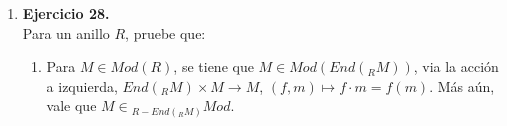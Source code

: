 \documentclass{article}
\newcommand{\lrprth}[1]{
	\left(#1\right)
}
\newcommand{\ringbimod}[4]{
	\if#4l
	{}_{#1-#2}#3
	\else
	\if#4r
	#3_{#1-#2}
	\else 
	\ifstrequal{#4}{lr}{
		{}_{#1}#3_{#2}
	}
	\fi
	\fi
}
\newcommand{\ringmodhom}[3]{
	Hom_{#1}\lrprth{#2,#3}
}
\theoremstyle{definition}
\theoremstyle{plain}
\theoremstyle{plain}
\theoremstyle{definition}
\theoremstyle{definition}
\theoremstyle{definition}
\theoremstyle{definition}
\theoremstyle{definition}
\theoremstyle{definition}
\begin{document}
\begin{enumerate}[label=\textbf{Ej \arabic*.}]
\begin{proof}
	\begin{align*}
		\rho\lrprth{ere\cdot\lrprth{em+em'}\cdot s}\lrprth{xe}&=\rho\lrprth{{ere}\cdot{e{\lrprth{m+m'}}\cdot s}}(xe)\\
		&=\rho\lrprth{ere\lrprth{m+m'}s}(xe)\\
		&=\lrprth{xe}\lrprth{re\lrprth{m+m'}s}\\
		&=\lrprth{xe}\lrprth{rems+rem's}\\
		&=\lrprth{xe}{rems}+\lrprth{xe}{rem's}\\
		&=\lrprth{\lrprth{xere}m}s+\lrprth{\lrprth{xere}m'}s\\
		&=\lrprth{\rho\lrprth{em}\lrprth{xere}}s+\lrprth{\rho\lrprth{em'}\lrprth{xere}}s\\
		&=\lrprth{\rho\lrprth{em}\lrprth{xe*ere}}s+\lrprth{\rho\lrprth{em'}\lrprth{xe*ere}}s\\
		&=\lrprth{ere\bullet\rho\lrprth{em}\lrprth{xe}}s+\lrprth{ere\bullet\rho\lrprth{em'}\lrprth{xe}}s\\
		&=\lrprth{ere\bullet\rho\lrprth{em}\bullet s}\lrprth{xe}+\lrprth{ere\bullet\rho\lrprth{em'}\bullet s}\lrprth{xe}\\
		&=\lrprth{ere\bullet\rho\lrprth{em}\bullet s+ere\bullet\rho\lrprth{em'}\bullet s}\lrprth{xe}\\
		\implies \rho\lrprth{{ere}\cdot\lrprth{em+em'}\cdot s}&=ere\bullet\rho\lrprth{em}\bullet s+ere\bullet\rho\lrprth{em'}\bullet s\\
		\therefore\  \rho&\in\ringmodhom{}{\ringbimod{R'}{S}{eM}{lr}}{\ringmodhom{R}{\ringbimod{R}{R'}{Re}{lr}}{\ringbimod{R}{S}{M}{lr}}}.
	\end{align*}
i.e. $\rho$ es un morfismo de $R$-izquierda $S'$-derecha bimódulos, de $eM$ en $\ringmodhom{R}{\ringbimod{R}{R'}{Re}{lr}}{\ringbimod{R}{S}{M}{lr}}$. En forma análoga, empleando ahora las acciones previamente definidas en conjunto a las acciones definidas en el Ej. 24(b), se verifica que $\lambda$ un morfismo de $R'$-izquierda $S$-derecha bimódulos, de $M\epsilon$ en $\ringmodhom{S}{\ringbimod{S'}{S }{Re}{lr}}{\ringbimod{R}{S}{M}{lr}}$.\\
\end{proof}
\item\textbf{Ejercicio 28.}\\
Para un anillo $R$, pruebe que:
\begin{enumerate}
	\item Para $M \in Mod\lrprth{R}$, se tiene que $M \in Mod\lrprth{End\lrprth{_{R}M}}$, via la acción a izquierda, $End\lrprth{_{R}M} \times M \longrightarrow M$, $\lrprth{f,m} \mapsto f \cdot m = f\lrprth{m}$. Más aún, vale que $M \in {}_{R-End\lrprth{_{R}M}}Mod$.

\end{enumerate}
\end{enumerate}
\end{document}
